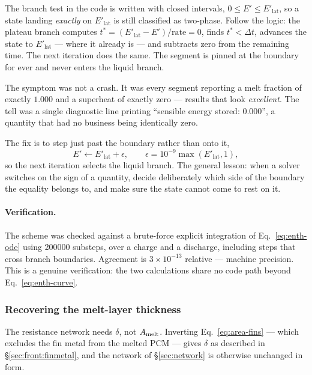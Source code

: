 \begin{worked}
The branch test in the code is written with closed intervals,
$0 \le E' \le E'_{\mathrm{lat}}$, so a state landing \emph{exactly} on
$E'_{\mathrm{lat}}$ is still classified as two-phase. Follow the logic: the
plateau branch computes $t^{*} = (E'_{\mathrm{lat}} - E')/\text{rate} = 0$,
finds $t^{*} < \Delta t$, advances the state to $E'_{\mathrm{lat}}$ ---
where it already is --- and subtracts zero from the remaining time. The next
iteration does the same. The segment is pinned at the boundary for ever and
never enters the liquid branch.

The symptom was not a crash. It was every segment reporting a melt fraction of
exactly $1.000$ and a superheat of exactly zero --- results that look
\emph{excellent}. The tell was a single diagnostic line printing ``sensible
energy stored: \num{0.000}'', a quantity that had no business being identically
zero.

The fix is to step just past the boundary rather than onto it,
\[
  E' \leftarrow E'_{\mathrm{lat}} + \epsilon,
  \qquad \epsilon = 10^{-9}\max\!\left(E'_{\mathrm{lat}},1\right),
\]
so the next iteration selects the liquid branch. The general lesson: when a
solver switches on the sign of a quantity, decide deliberately which side of the
boundary the equality belongs to, and make sure the state cannot come to rest
on it.
\end{worked}

\paragraph{Verification.}
The scheme was checked against a brute-force explicit integration of
Eq.~\eqref{eq:enth-ode} using \num{200000} substeps, over a charge and a
discharge, including steps that cross branch boundaries. Agreement is
$3\times10^{-13}$ relative --- machine precision. This is a genuine
verification: the two calculations share no code path beyond
Eq.~\eqref{eq:enth-curve}.

\subsubsection{Recovering the melt-layer thickness}

The resistance network needs $\delta$, not $A_{\mathrm{melt}}$. Inverting
Eq.~\eqref{eq:area-fins} --- which excludes the fin metal from the melted PCM
--- gives $\delta$ as described in \S\ref{sec:front:finmetal}, and the network
of \S\ref{sec:network} is otherwise unchanged in form.

